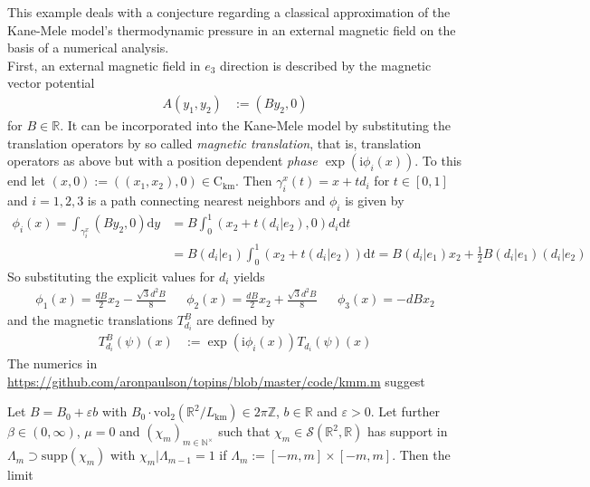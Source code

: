 \begin{exa}
\label{exa:tdpressure}
This example deals with a conjecture regarding a classical approximation of the Kane-Mele model's thermodynamic pressure in an external magnetic field on the basis of a numerical analysis.
\\
First, an external magnetic field in $e_{3}$ direction is described by the magnetic vector potential
\begin{align*}
  A(y_{1},y_{2})
  &:=
  (By_{2},0)
\end{align*}
for $B \in \mathbb{R}$. It can be incorporated into the Kane-Mele model by substituting the translation operators by so called \textit{magnetic translation}, that is, translation operators as above but with a position dependent \textit{phase $\exp(\mathrm{i}\phi_{i}(x))$}. To this end let $(x,0) := ((x_{1},x_{2}),0) \in \mathrm{C}_{\textrm{km}}$. Then $\gamma_{i}^{x}(t) = x +td_{i}$ for $t \in [0,1]$ and $i =1,2,3$ is a path connecting nearest neighbors and $\phi_{i}$ is given by
\begin{align*}
  \phi_{i}(x)
  =
  \int_{\gamma_{i}^{x}}
  (By_{2},0)
  \mathrm{d}y
  &=
  B
  \int_{0}^{1}
  (x_{2}+t(d_{i} \vert e_{2}),0)
  d_{i}
  \mathrm{d}t
  \\
  &=
  B
  (d_{i} \vert e_{1})
  \int_{0}^{1}
  (x_{2}+t(d_{i} \vert e_{2}))
  \mathrm{d}t
  =
  B
  (d_{i} \vert e_{1})
  x_{2}
  +
  \frac{1}{2}
  B
  (d_{i} \vert e_{1})
  (d_{i} \vert e_{2})
\end{align*}
So substituting the explicit values for $d_{i}$ yields
\begin{align*}
  \phi_{1}(x)
  =
  \frac{dB}{2}
  x_{2}
  -
  \frac{\sqrt{3}d^{2}B}{8}
  &&
  \phi_{2}(x)
  =
  \frac{dB}{2}
  x_{2}
  +
  \frac{\sqrt{3}d^{2}B}{8}
  &&
  \phi_{3}(x)
  =
  -
  dBx_{2}
\end{align*}
and the magnetic translations $T_{d_{i}}^{B}$ are defined by
\begin{align*}
  T_{d_{i}}^{B}(\psi)(x)
  &:=
  \exp(\mathrm{i}\phi_{i}(x))
  T_{d_{i}}(\psi)(x)
\end{align*}
The numerics in \href{https://github.com/aronpaulson/topins/blob/master/code/kmm.m}{https://github.com/aronpaulson/topins/blob/master/code/kmm.m} suggest
\\
\begin{con}
\label{con:pressofkmm}
Let $B = B_{0} + \varepsilon b$ with $B_{0} \cdot \mathrm{vol}_{2}(\mathbb{R}^{2}/L_{\textrm{km}}) \in 2\pi\mathbb{Z}$, $b \in \mathbb{R}$ and $\varepsilon > 0$. Let further $\beta \in (0,\infty)$, $\mu = 0$ and $(\chi_{m})_{m\in\mathbb{N}^{\times}}$ such that $\chi_{m} \in \mathcal{S}(\mathbb{R}^{2},\mathbb{R})$ has support in $\Lambda_{m} \supset \mathrm{supp}(\chi_{m})$ with $\chi_{m} \vert \Lambda_{m-1} = 1$ if $\Lambda_{m} := [-m,m] \times [-m,m]$. Then the limit

\end{con}
\end{exa}
